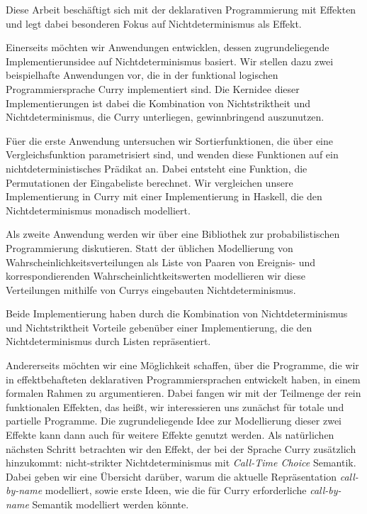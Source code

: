 Diese Arbeit besch\"aftigt sich mit der deklarativen Programmierung mit Effekten und legt dabei besonderen Fokus auf Nichtdeterminismus als Effekt.

Einerseits m\"ochten wir Anwendungen entwicklen, dessen zugrundeliegende Implementierunsidee auf Nichtdeterminismus basiert.
Wir stellen dazu zwei beispielhafte Anwendungen vor, die in der funktional logischen Programmiersprache Curry implementiert sind.
Die Kernidee dieser Implementierungen ist dabei die Kombination von Nichtstriktheit und Nichtdeterminismus, die Curry unterliegen, gewinnbringend auszunutzen.

F\"uer die erste Anwendung untersuchen wir Sortierfunktionen, die \"uber eine Vergleichsfunktion parametrisiert sind, und wenden diese Funktionen auf ein nichtdeterministisches Pr\"adikat an.
Dabei entsteht eine Funktion, die Permutationen der Eingabeliste berechnet.
Wir vergleichen unsere Implementierung in Curry mit einer Implementierung in Haskell, die den Nichtdeterminismus monadisch modelliert.

Als zweite Anwendung werden wir \"uber eine Bibliothek zur probabilistischen Programmierung diskutieren.
Statt der \"ublichen Modellierung von Wahrscheinlichkeitsverteilungen als Liste von Paaren von Ereignis- und korrespondierenden Wahrscheinlichtkeitswerten modellieren wir diese Verteilungen mithilfe von Currys eingebauten Nichtdeterminismus.

Beide Implementierung haben durch die Kombination von Nichtdeterminismus und Nichtstriktheit Vorteile geben\"uber einer Implementierung, die den Nichtdeterminismus durch Listen repr\"asentiert.

Andererseits m\"ochten wir eine M\"oglichkeit schaffen, \"uber die Programme, die wir in effektbehafteten deklarativen Programmiersprachen entwickelt haben, in einem formalen Rahmen zu argumentieren.
Dabei fangen wir mit der Teilmenge der rein funktionalen Effekten, das hei\ss{}t, wir interessieren uns zun\"achst f\"ur totale und partielle Programme.
Die zugrundeliegende Idee zur Modellierung dieser zwei Effekte kann dann auch f\"ur weitere Effekte genutzt werden.
Als nat\"urlichen n\"achsten Schritt betrachten wir den Effekt, der bei der Sprache Curry zus\"atzlich hinzukommt: nicht-strikter Nichtdeterminismus mit \emph{Call-Time Choice} Semantik.
Dabei geben wir eine \"Ubersicht dar\"uber, warum die aktuelle Repr\"asentation \emph{call-by-name} modelliert, sowie erste Ideen, wie die f\"ur Curry erforderliche \emph{call-by-name} Semantik modelliert werden k\"onnte.

\endgroup